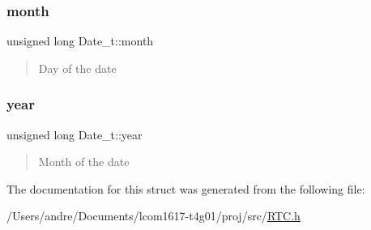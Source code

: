 \subsubsection{\texorpdfstring{month}{month}}
{\footnotesize\ttfamily unsigned long Date\+\_\+t\+::month}



\begin{quote}
Day of the date \end{quote}


\hypertarget{struct_date__t_af593228c5b6e2316a755c061bbea3d34}{}\label{struct_date__t_af593228c5b6e2316a755c061bbea3d34} 
\subsubsection{\texorpdfstring{year}{year}}
{\footnotesize\ttfamily unsigned long Date\+\_\+t\+::year}



\begin{quote}
Month of the date \end{quote}




The documentation for this struct was generated from the following file\+:\begin{DoxyCompactItemize}
\item 
/\+Users/andre/\+Documents/lcom1617-\/t4g01/proj/src/\hyperlink{_r_t_c_8h}{R\+T\+C.\+h}\end{DoxyCompactItemize}
